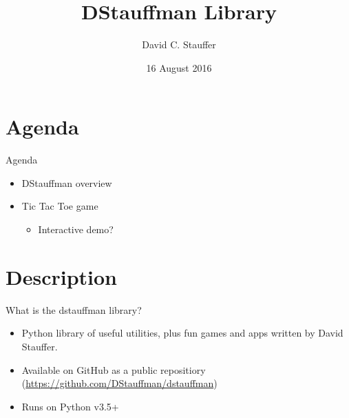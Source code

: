 \documentclass{beamer}
\title{DStauffman Library}
\author{David C. Stauffer}
\date{16 August 2016}
\begin{document}
\begin{frame}
\titlepage
\end{frame}

\section{Agenda}
\begin{frame}{Agenda}
    \begin{itemize}
        \item DStauffman overview
        \item Tic Tac Toe game
        \begin{itemize}
            \item Interactive demo?
        \end{itemize}
    \end{itemize}
\end{frame}


\section{Description}
\begin{frame}{What is the dstauffman library?}
    \begin{itemize}
        \item Python library of useful utilities, plus fun games and apps written by David Stauffer.
        \item Available on GitHub as a public repositiory (\url{https://github.com/DStauffman/dstauffman})
        \item Runs on Python v3.5+
    \end{itemize}
\end{frame}
\end{document}

